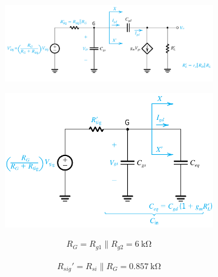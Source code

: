 \documentclass{article}
\begin{document}
\begin{figure}[H]
  \centering
  \begin{subfigure}{.65\textwidth}
    \centering
    \includegraphics[width=\linewidth]{figures/Problem6443}
    \label{fig:}
  \end{subfigure}%
  \begin{subfigure}{.35\textwidth}
    \centering
    \includegraphics[width=\linewidth]{figures/Problem6444}
    \label{fig:}
  \end{subfigure}
  \label{fig:}
\end{figure}

\begin{equation*}
  \begin{aligned}
    R_G = R_{g1} \parallel R_{g2} = 6 \  \mathrm{k \Omega}
  \end{aligned}
\end{equation*}

\begin{equation*}
  \begin{aligned}
    R_{sig}' = R_{si} \parallel R_G = 0.857 \  \mathrm{k \Omega}
  \end{aligned}
\end{equation*}
\end{document}
